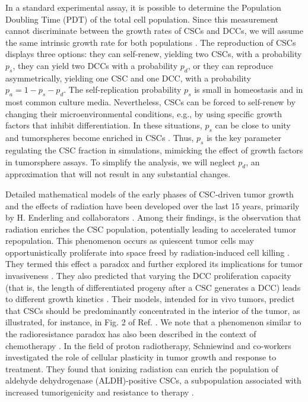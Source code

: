 \documentclass[10pt,letterpaper]{article}
\begin{document}
In a standard experimental assay, it is possible to determine the Population Doubling Time (PDT) of the total cell population. Since this measurement cannot discriminate between the growth rates of CSCs and DCCs, we will assume the same intrinsic growth rate for both populations  \cite{benitez2021}. The reproduction of CSCs displays three options: they can self-renew, yielding two CSCs, with a probability $p_s$, they can yield two DCCs with a probability $p_d$, or they can reproduce asymmetrically, yielding one CSC and one DCC, with a probability $p_a = 1 - p_s - p_d$. The self-replication probability $p_s$ is small in homeostasis and in most common culture media. Nevertheless, CSCs can be forced to self-renew by changing their microenvironmental conditions, e.g., by using specific growth factors that inhibit differentiation. In these situations, $p_s$ can be close to unity and tumorspheres become enriched in CSCs \cite{wang2016novel,marks2024role}. Thus, $p_s$ is the key parameter regulating the CSC fraction in simulations, mimicking the effect of growth factors in tumorsphere assays. To simplify the analysis, we will neglect $p_d$, an approximation that will not result in any substantial changes.

Detailed mathematical models of the early phases of CSC-driven tumor growth and the effects of radiation have been developed over the last 15 years, primarily by H. Enderling and collaborators \cite{enderling2009, enderling2009a, gao2013, enderling2015, poleszczuk2015}. Among their findings, is the observation that radiation enriches the CSC population, potentially leading to accelerated tumor repopulation. This phenomenon occurs as quiescent tumor cells may opportunistically proliferate into space freed by radiation-induced cell killing \cite{enderling2009a, gao2013}. They termed this effect a paradox and further explored its implications for tumor invasiveness \cite{shyntar2022}. They also predicted that varying the DCC proliferation capacity (that is, the length
of differentiated progeny after a CSC generates a DCC) leads to different growth kinetics \cite{enderling2011, morton2011, poleszczuk2015}. Their models, intended for in vivo tumors,   predict that CSCs should be predominantly concentrated in the interior of the tumor, as illustrated, for instance, in Fig. 2 of Ref. \cite{gao2013}.  We note that a phenomenon similar to the radioresistance paradox has also been described in the context of chemotherapy \cite{menchon2011}. In the field of proton radiotherapy, Schniewind and co-workers investigated the role of cellular plasticity in tumor growth and response to treatment. They found that ionizing radiation can enrich the population of aldehyde dehydrogenase (ALDH)-positive CSCs, a subpopulation associated with increased tumorigenicity and resistance to therapy \cite{schniewind2022}.
\end{document}
